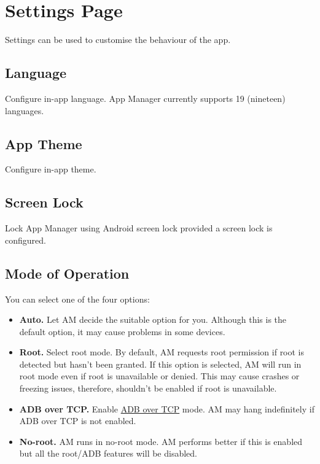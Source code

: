 \section{Settings Page}\label{sec:settings-page}
Settings can be used to customise the behaviour of the app.

\subsection{Language}\label{subsec:language}
Configure in-app language.
App Manager currently supports 19 (nineteen) languages.

\subsection{App Theme}\label{subsec:app-theme}
Configure in-app theme.

\subsection{Screen Lock}\label{subsec:screen-lock}
Lock App Manager using Android screen lock provided a screen lock is configured.

\subsection{Mode of Operation}\label{subsec:mode-of-operation}
You can select one of the four options:
\begin{itemize}
    \item \textbf{Auto.} Let AM decide the suitable option for you.
    Although this is the default option, it may cause problems in some devices.

    \item \textbf{Root.} Select root mode.
    By default, AM requests root permission if root is detected but hasn't been granted.
    If this option is selected, AM will run in root mode even if root is unavailable or denied.
    This may cause crashes or freezing issues, therefore, shouldn't be enabled if root is unavailable.

    \item \textbf{ADB over TCP.} Enable \hyperref[sec:adb-over-tcp]{ADB over TCP} mode.
    AM may hang indefinitely if ADB over TCP is not enabled.

    \item \textbf{No-root.} AM runs in no-root mode.
    AM performs better if this is enabled but all the root/ADB features will be disabled.
\end{itemize}

